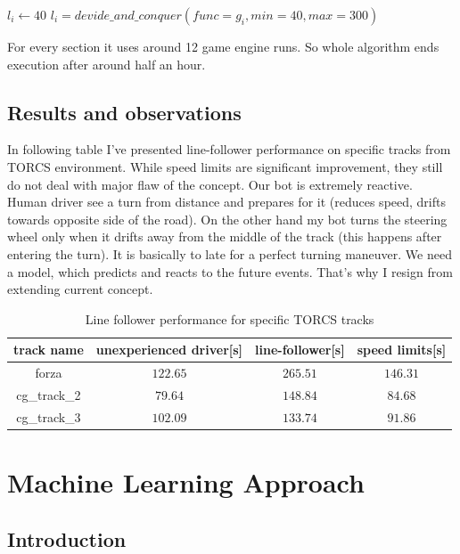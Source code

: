 \documentclass[declaration,shortabstract,english,inz]{iithesis}
\begin{document}
\begin{algorithmic}
    \STATE $l_i\gets 40$
        \STATE $l_i = devide\_and\_conquer(func=g_i, min=40, max=300)$
    \ENDFOR
\end{algorithmic}

For every section it uses around 12 game engine runs. So whole algorithm ends execution after around half an hour.

\section{Results and observations}

In following table I've presented line-follower performance on specific tracks from TORCS environment. While speed limits are significant improvement, they still do not deal with major flaw of the concept. Our bot is extremely reactive. Human driver see a turn from distance and prepares for it (reduces speed, drifts towards opposite side of the road). On the other hand my bot turns the steering wheel only when it drifts away from the middle of the track (this happens after entering the turn). It is basically to late for a perfect turning maneuver. We need a model, which predicts and reacts to the  future events. That's why I resign from extending current concept.


\begin{table}[h]
    \centering
    \begin{tabular}{ |c|c|c|c|}
          \hline
          track name & unexperienced driver[s] & line-follower[s] & speed limits[s]  \\
          \hline
          forza &  $122.65$ & $265.51$ & $146.31$   \\
          \hline
          cg\_track\_2 & $79.64$ & $148.84$ &  $84.68$  \\ 
          \hline
          cg\_track\_3 & $102.09$ & $133.74$ & $91.86$   \\
          \hline
        \end{tabular}
        \caption{Line follower performance for specific TORCS tracks}
        \label{tab:line_follower}

\end{table}

\chapter{Machine Learning Approach}

\section{Introduction}
\end{document}
